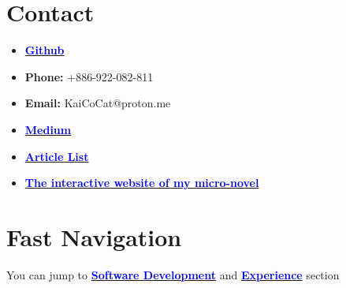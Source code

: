 \documentclass[11pt]{article}
\begin{document}
\begin{multicols*}{2}
    





\section*{Contact}
{\footnotesize
\begin{itemize}[noitemsep]
    \item \href{https://github.com/Kuo-TingKai}{\textbf{\textcolor{blue}{Github}}}
    \item \textbf{Phone:} +886-922-082-811
    \item \textbf{Email:} KaiCoCat@proton.me
    \item \href{https://medium.com/@nehsm30126}{\textbf{\textcolor{blue}{Medium}}} 
    \item \href{https://www.overleaf.com/read/xzdtxtgxtnby#49163b}{\textbf{\textcolor{blue}{Article List}}}
    \item \href{https://github.com/Kuo-TingKai/theorem-dream}{\textbf{\textcolor{blue}{The interactive website of my micro-novel}}}
\end{itemize}
}

\section*{Fast Navigation}
You can jump to \href{#software-dev}{\textbf{\textcolor{blue}{Software Development}}} and \href{#experience}{\textbf{\textcolor{blue}{Experience}}} section\\


\end{multicols*}
\end{document}
